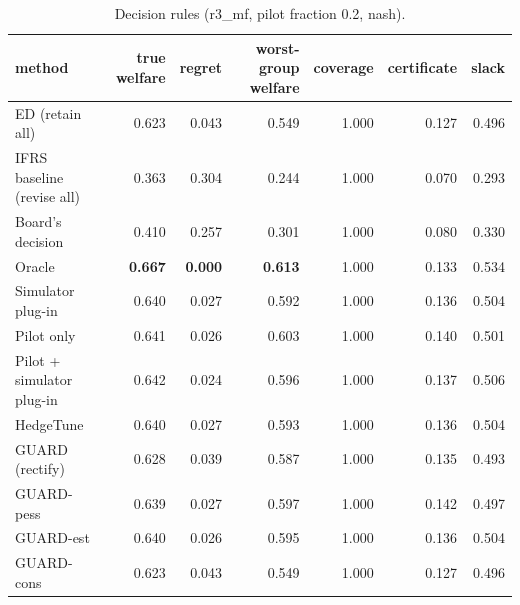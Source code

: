 \begin{table}[t]
\centering
\small
\begin{tabular}{lrrrrrr}
\toprule
method & true welfare & regret & worst-group welfare & coverage & certificate & slack \\
\midrule
ED (retain all) & 0.623 & 0.043 & 0.549 & 1.000 & 0.127 & 0.496 \\
IFRS baseline (revise all) & 0.363 & 0.304 & 0.244 & 1.000 & 0.070 & 0.293 \\
Board's decision & 0.410 & 0.257 & 0.301 & 1.000 & 0.080 & 0.330 \\
Oracle & \textbf{0.667} & \textbf{0.000} & \textbf{0.613} & 1.000 & 0.133 & 0.534 \\
Simulator plug-in & 0.640 & 0.027 & 0.592 & 1.000 & 0.136 & 0.504 \\
Pilot only & 0.641 & 0.026 & 0.603 & 1.000 & 0.140 & 0.501 \\
Pilot + simulator plug-in & 0.642 & 0.024 & 0.596 & 1.000 & 0.137 & 0.506 \\
HedgeTune & 0.640 & 0.027 & 0.593 & 1.000 & 0.136 & 0.504 \\
GUARD (rectify) & 0.628 & 0.039 & 0.587 & 1.000 & 0.135 & 0.493 \\
GUARD-pess & 0.639 & 0.027 & 0.597 & 1.000 & 0.142 & 0.497 \\
GUARD-est & 0.640 & 0.026 & 0.595 & 1.000 & 0.136 & 0.504 \\
GUARD-cons & 0.623 & 0.043 & 0.549 & 1.000 & 0.127 & 0.496 \\
\bottomrule
\end{tabular}
\caption{Decision rules (r3\_mf, pilot fraction 0.2, nash).}
\label{tab:methods-nash}
\end{table}
